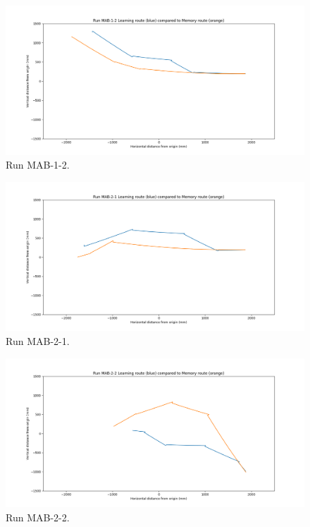 \documentclass[a4paper,11pt,twoside,openright]{article}
\begin{document}
\begin{figure}[h!]
 \centering
  \includegraphics[width=\textwidth]{MAB-1-2}
  \caption{
    \label{fig:mab-1-2} Run MAB-1-2.
  }
\end{figure}

\begin{figure}[h!]
 \centering
  \includegraphics[width=\textwidth]{MAB-2-1}
  \caption{
    \label{fig:mab-2-1} Run MAB-2-1.
  }
\end{figure}

\begin{figure}[h!]
 \centering
  \includegraphics[width=\textwidth]{MAB-2-2}
  \caption{
    \label{fig:mab-2-2} Run MAB-2-2.
  }
\end{figure}
\end{document}
